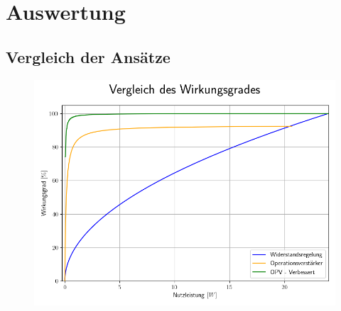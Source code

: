 \documentclass{beamer}
\begin{document}
	\section{Auswertung}
	\subsection{Vergleich der Ansätze}
	\begin{frame}
		\begin{center}
			\begin{figure}[tbh]
				\centering
				\includegraphics[width=0.95\linewidth]{medien/3.png}
			\end{figure}
		\end{center}
	\end{frame}
\end{document}

